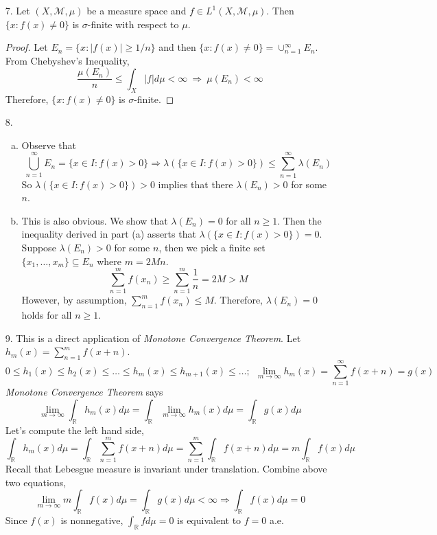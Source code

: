 \begin{itemize}
		\item[7.] Let $(X,\mathcal{M}, \mu)$ be a measure space and $f \in L^1(X,\mathcal{M}, \mu)$. Then $\{x : f(x) \neq 0\}$ is
		$\sigma$-finite with respect to $\mu$.

		\begin{proof}
			Let $E_n = \{x: |f(x)| \ge 1/n \}$ and then $\{x: f(x)\neq 0\} = \cup_{n=1}^\infty  E_n$. From Chebyshev's Inequality, 
			$$
			\frac{ \mu(E_n)}{n} \le  \int_X |f| d\mu < \infty ~\Rightarrow~ \mu(E_n) < \infty
			$$	
			Therefore, $\{x : f(x) \neq 0\}$ is $\sigma$-finite.
		\end{proof}
	
		\item[8.] 
		\begin{enumerate}[(a)]
			\item Observe that 
			$$
			\bigcup_{n=1}^\infty E_n = \{x\in I: f(x) > 0\} \Rightarrow \lambda(\{x\in I: f(x) > 0\}) \le \sum_{n=1}^\infty \lambda(E_n)
			$$
			So $\lambda(\{x\in I: f(x) > 0\}) > 0$ implies that there $\lambda(E_n)>0$ for some $n$.
			
			\item This is also obvious. We show that $\lambda(E_n) = 0$ for all $n\ge 1$. Then the inequality derived in part (a) asserts that $\lambda(\{x\in I: f(x) > 0\}) = 0$. Suppose $\lambda(E_n) > 0$ for some $n$, then we pick a finite set $\{x_1,\ldots, x_m\}\subseteq E_n$ where $m = 2Mn$. 
			$$
			\sum_{n=1}^m f(x_n) \ge \sum_{n=1}^m \frac{1}{n} = 2M > M
			$$ 
			However, by assumption, $\sum_{n=1}^m f(x_n) \le M$. Therefore, $\lambda(E_n) = 0$ holds for all $n\ge 1$.
		\end{enumerate}
		
		
		\item[9.] This is a direct application of \textit{Monotone Convergence Theorem}. Let $h_m(x) = \sum_{n=1}^m f(x+n)$. 
		$$
		0\le h_1(x)\le h_2(x) \le \ldots \le h_m(x)\le h_{m+1}(x)\le \ldots;~~\lim_{m\rightarrow \infty} h_m(x) = \sum_{n=1}^\infty f(x+n) = g(x)
		$$
		\textit{Monotone Convergence Theorem} says
		$$
		\lim_{m\rightarrow \infty} \int_\mathbb{R} h_m(x) d\mu= \int_{\mathbb{R}} \lim_{m\rightarrow \infty} h_m(x) d\mu= \int_{\mathbb{R}} g(x) d\mu
		$$
		Let's compute the left hand side,
		$$
		\int_{\mathbb{R}} h_m(x) d\mu = \int_{\mathbb{R}} \sum_{n=1}^m f(x+n) d\mu = \sum_{n=1}^m \int_{\mathbb{R}} f(x+n)d\mu = m\int_{\mathbb{R}} f(x) d\mu 
		$$
		Recall that Lebesgue measure is invariant under translation. Combine above two equations, 
		$$
		\lim_{m\rightarrow \infty} m\int_{\mathbb{R}}f(x)d\mu = \int_{\mathbb{R}} g(x)d\mu < \infty \Rightarrow \int_{\mathbb{R}} f(x) d\mu=0
		$$
		Since $f(x)$ is nonnegative, $\int_{\mathbb{R}}f d\mu = 0$ is equivalent to $f=0$ a.e.
		

\end{itemize}
